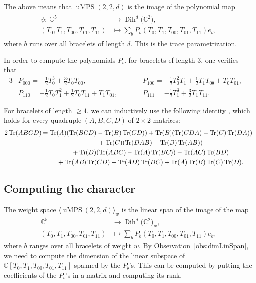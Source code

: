 \documentclass[pdftex]{sigma}
\numberwithin{equation}{section}
\DeclareMathOperator{\Tr}{Tr}
\newcommand{\CC}{\mathbb{C}}
\DeclareMathOperator{\uMPS}{uMPS}
\DeclareMathOperator{\Dih}{Dih}
\begin{document}
 The above means that $\uMPS(2,2,d)$ is the image of the polynomial map
 \begin{align} \label{eq:traceParMap}
 \begin{split}
     \psi\colon \  \CC^5 &\to \Dih^d\big(\CC^2\big), \\
     (T_0,T_1,T_{00},T_{01},T_{11})& \mapsto \sum_{b}{P_b(T_0,T_1,T_{00},T_{01},T_{11})e_b},
     \end{split}
 \end{align}
 where $b$ runs over all bracelets of length $d$. This is the trace parametrization.

 In order to compute the polynomials $P_b$, for bracelets of length $3$, one verifies that
 \begin{alignat*}{3}
 &   P_{000}= -\frac{1}{2}T_0^3 + \frac{3}{2}T_0T_{00},\qquad& &
    P_{100}= -\frac{1}{2}T_0^2T_1 + \frac{1}{2}T_1T_{00}+ T_0T_{01}, &\\
&    P_{110}= -\frac{1}{2}T_0T_1^2 + \frac{1}{2}T_0T_{11}+ T_1T_{01},\qquad & &
    P_{111}= -\frac{1}{2}T_1^3 + \frac{3}{2}T_1T_{11}.&
 \end{alignat*}

For bracelets of length $\geq 4$, we can inductively use the following identity \cite{sibirskii1968algebraic}, which holds for every quadruple $(A,B,C,D)$ of $2 \times 2$ matrices:
\begin{gather*}
    2\Tr(ABCD) = \Tr(A) (\Tr(BCD) - \Tr(B)\Tr(CD) ) + \Tr(B) (\Tr(CDA) - \Tr(C)\Tr(DA) ) \nonumber\\
  \hphantom{2\Tr(ABCD) =}{}   + \Tr(C) (\Tr(DAB) - \Tr(D)\Tr(AB) ) \nonumber \\
  \hphantom{2\Tr(ABCD) =}{} + \Tr(D) (\Tr(ABC) - \Tr(A)\Tr(BC) ) -\Tr(AC)\Tr(BD)\\ %
\hphantom{2\Tr(ABCD) =}{} + \Tr(AB)\Tr(CD) + \Tr(AD)\Tr(BC)  + \Tr(A)\Tr(B)\Tr(C)\Tr(D).  \nonumber
\end{gather*}

\subsection{Computing the character}\label{subsec: char}
 The weight space
 $\langle \uMPS(2,2,d) \rangle_w$
 is the linear span of the image of the map
\begin{align*}
     \CC^5 &\to \Dih^d\big(\CC^2\big)_w ,\\
     (T_0,T_1,T_{00},T_{01},T_{11})& \mapsto \sum_{b}{P_b(T_0,T_1,T_{00},T_{01},T_{11})e_b},
 \end{align*}
 where $b$ ranges over all bracelets of weight $w$. By Observation~\ref{obs:dimLinSpan}, we need to compute the dimension of the linear subspace of $\CC[T_0,T_1,T_{00},T_{01},T_{11}]$ spanned by the $P_b$'s. This can be computed by putting the coefficients of the $P_b$'s in a matrix and computing its rank.
\end{document}
